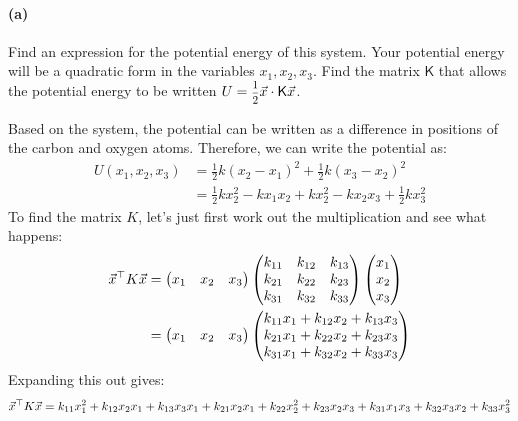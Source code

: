 \documentclass{article}
\begin{document}
	
\paragraph{(a)}
Find an expression for the potential energy of this system.  Your potential energy will be a quadratic form in the variables $x_{1}, x_{2}, x_{3}$.  
Find the matrix $\mathsf{K}$ that allows the potential energy to be written $U = \fracsm{1}{2}\vec{x}\cdot \mathsf{K}\vec{x}$.

\begin{solution}
	Based on the system, the potential can be written as a difference in positions of the carbon and oxygen
	atoms. Therefore, we can write the potential as:
	\begin{align*}
		U(x_1, x_2, x_3) &= \frac{1}{2}k(x_2 - x_1)^2 + \frac{1}{2}k(x_3 - x_2)^2\\
		&= \frac{1}{2}kx_2^2 - kx_1x_2 + kx_2^2 - kx_2x_3 + \frac{1}{2}kx_3^2
	\end{align*} 
	To find the matrix $K$, let's just first work out the multiplication and see what happens:
	\begin{align*}
		\vec x^\top K \vec x &= \begin{pmatrix} x_1 & x_2 & x_3 \end{pmatrix} \begin{pmatrix} k_{11} & k_{12} & k_{13}\\k_{21}& k_{22} & k_{23}\\k_{31} & k_{32} & k_{33} \end{pmatrix} \begin{pmatrix} x_1 \\x_2\\x_3 \end{pmatrix} \\
						   &= \begin{pmatrix} x_1 & x_2& x_3 \end{pmatrix} \begin{pmatrix} 
					   k_{11}x_1 + k_{12}x_2 + k_{13}x_3\\k_{21}x_1 + k_{22} x_2 + k_{23} x_3\\
	k_{31}x_1 + k_{32} x_2 + k_{33}x_3\end{pmatrix} 
	\end{align*}
	Expanding this out gives: 
	\begin{multline*}
		\vec x^\top K \vec x = k_{11}x_1^2 + k_{12}x_2x_1 + k_{13}x_3x_1 + k_{21} x_2x_1 + k_{22}x_2^2 +
		k_{23}x_2x_3 + k_{31}x_1x_3 + k_{32}x_3x_2 + k_{33}x_3^2
	\end{multline*}

\end{solution}
\end{document}
